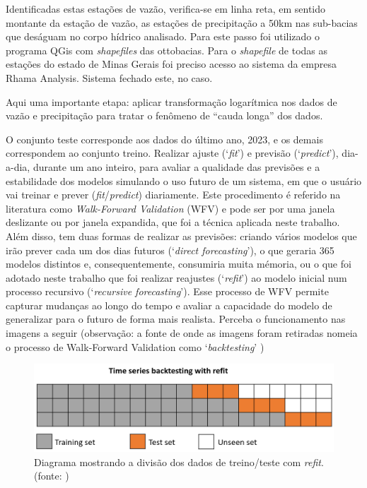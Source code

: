 Identificadas estas estações de vazão, verifica-se em linha reta, em sentido montante da estação de vazão, as estações de precipitação a 50km nas sub-bacias que deságuam no corpo hídrico analisado. Para este passo foi utilizado o programa QGis com \textit{shapefiles} das ottobacias.\cite{snirh_ottobacia_2024} Para o \textit{shapefile} de todas as estações do estado de Minas Gerais foi preciso acesso ao sistema da empresa Rhama Analysis. Sistema fechado este, no caso.


Aqui uma importante etapa: aplicar transformação logarítmica nos dados de vazão e precipitação para tratar o fenômeno de ``cauda longa'' dos dados.

O conjunto teste corresponde aos dados do último ano, 2023, e os demais correspondem ao conjunto treino. Realizar ajuste (`\textit{fit}') e previsão (`\textit{predict}'), dia-a-dia, durante um ano inteiro, para avaliar a qualidade das previsões e a estabilidade dos modelos simulando o uso futuro de um sistema, em que o usuário vai treinar e prever (\textit{fit}/\textit{predict}) diariamente. Este procedimento é referido na literatura como \textit{Walk-Forward Validation} (WFV) e pode ser por uma janela deslizante ou por janela expandida, que foi a técnica aplicada neste trabalho. Além disso, tem duas formas de realizar as previsões: criando vários modelos que irão prever cada um dos dias futuros (`\textit{direct forecasting}'), o que geraria 365 modelos distintos e, consequentemente, consumiria muita mémoria, ou o que foi adotado neste trabalho que foi realizar reajustes (`\textit{refit}') ao modelo inicial num processo recursivo (`\textit{recursive forecasting}'). Esse processo de WFV permite capturar mudanças ao longo do tempo e avaliar a capacidade do modelo de generalizar para o futuro de forma mais realista. Perceba o funcionamento nas imagens a seguir (observação: a fonte de onde as imagens foram retiradas nomeia o processo de Walk-Forward Validation como `\textit{backtesting}' \cite{skforecast_a})

\begin{figure}[!h]
	\centering
	\includegraphics[scale=0.3]{Figuras/skforecast-diagram-backtesting-refit.png}
	\caption{Diagrama mostrando a divisão dos dados de treino/teste com \textit{refit}.\\(fonte: \cite{skforecast_a})}
	\label{fig:skforecast-diagram-backtesting-refit}
\end{figure}

